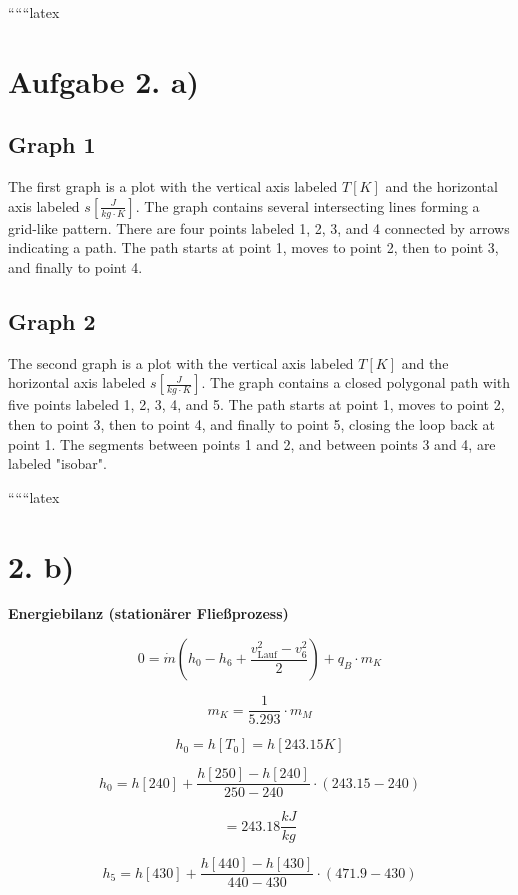 
``````latex


\section*{Aufgabe 2. a)}

\subsection*{Graph 1}

The first graph is a plot with the vertical axis labeled \( T [K] \) and the horizontal axis labeled \( s \left[ \frac{J}{kg \cdot K} \right] \). The graph contains several intersecting lines forming a grid-like pattern. There are four points labeled 1, 2, 3, and 4 connected by arrows indicating a path. The path starts at point 1, moves to point 2, then to point 3, and finally to point 4. 

\subsection*{Graph 2}

The second graph is a plot with the vertical axis labeled \( T [K] \) and the horizontal axis labeled \( s \left[ \frac{J}{kg \cdot K} \right] \). The graph contains a closed polygonal path with five points labeled 1, 2, 3, 4, and 5. The path starts at point 1, moves to point 2, then to point 3, then to point 4, and finally to point 5, closing the loop back at point 1. The segments between points 1 and 2, and between points 3 and 4, are labeled "isobar".

``````latex


\section*{2. b)}

\textbf{Energiebilanz (stationärer Fließprozess)}

\[
0 = \dot{m} \left( h_0 - h_6 + \frac{v_{\text{Lauf}}^2 - v_6^2}{2} \right) + q_B \cdot m_K
\]

\[
m_K = \frac{1}{5.293} \cdot m_M
\]

\[
h_0 = h[T_0] = h[243.15 K]
\]

\[
h_0 = h[240] + \frac{h[250] - h[240]}{250 - 240} \cdot (243.15 - 240)
\]

\[
= 243.18 \frac{kJ}{kg}
\]

\[
h_5 = h[430] + \frac{h[440] - h[430]}{440 - 430} \cdot (471.9 - 430)
\]


